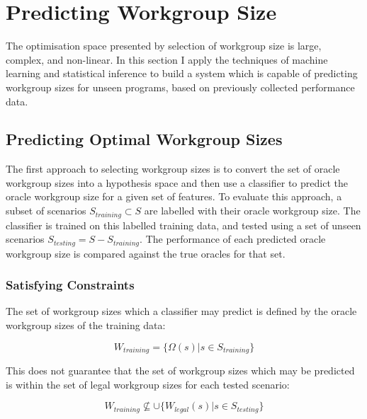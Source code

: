 \section{Predicting Workgroup Size}

The optimisation space presented by selection of workgroup size is
large, complex, and non-linear. In this section I apply the techniques
of machine learning and statistical inference to build a system which
is capable of predicting workgroup sizes for unseen programs, based on
previously collected performance data.


\subsection{Predicting Optimal Workgroup Sizes}

The first approach to selecting workgroup sizes is to convert the set
of oracle workgroup sizes into a hypothesis space and then use a
classifier to predict the oracle workgroup size for a given set of
features. To evaluate this approach, a subset of scenarios
$S_{training} \subset S$ are labelled with their oracle workgroup
size. The classifier is trained on this labelled training data, and
tested using a set of unseen scenarios
$S_{testing} = S - S_{training}$. The performance of each predicted
oracle workgroup size is compared against the true oracles for that
set.


\subsubsection{Satisfying Constraints}

The set of workgroup sizes which a classifier may predict is defined
by the oracle workgroup sizes of the training data:

\begin{equation}
W_{training} = \{ \Omega(s) | s \in S_{training} \}
\end{equation}

This does not guarantee that the set of workgroup sizes which may be
predicted is within the set of legal workgroup sizes for each tested
scenario:

\begin{equation}
W_{training} \nsubseteq \cup \{ W_{legal}(s) | s \in S_{testing} \}
\end{equation}


